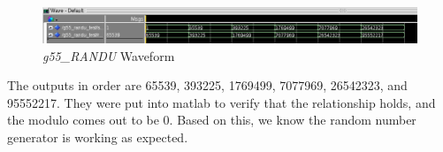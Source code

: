 \documentclass[12pt]{article}
\begin{document}
\begin{figure}[h!t]
\centering
\includegraphics[scale=0.3]{graphics/randu_wave2.png}
\caption{\textit{g55\_RANDU} Waveform}
\end{figure}

The outputs in order are 65539, 393225, 1769499, 7077969, 26542323, and 95552217. They were put into matlab to verify that the relationship holds, and the modulo comes out to be 0. Based on this, we know the random number generator is working as expected.
\end{document}
